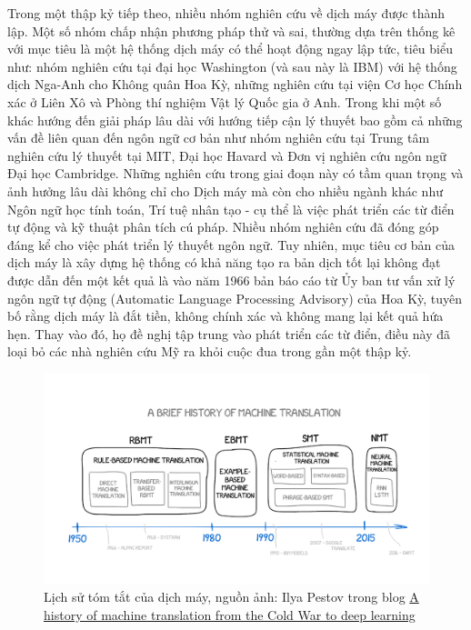 Trong một thập kỷ tiếp theo, nhiều nhóm nghiên cứu về dịch máy được thành lập. Một số nhóm chấp nhận phương pháp thử và sai, thường dựa trên thống kê với mục tiêu là một hệ thống dịch máy có thể hoạt động ngay lập tức, tiêu biểu như: nhóm nghiên cứu tại đại học Washington (và sau này là IBM) với hệ thống dịch Nga-Anh cho Không quân Hoa Kỳ, những nghiên cứu tại viện Cơ học Chính xác ở Liên Xô và Phòng thí nghiệm Vật lý Quốc gia ở Anh. Trong khi một số khác hướng đến giải pháp lâu dài với hướng tiếp cận lý thuyết bao gồm cả những vấn đề liên quan đến ngôn ngữ cơ bản như nhóm nghiên cứu tại Trung tâm nghiên cứu lý thuyết tại MIT, Đại học Havard và Đơn vị nghiên cứu ngôn ngữ Đại học Cambridge. Những nghiên cứu trong giai đoạn này có tầm quan trọng và ảnh hưởng lâu dài không chỉ cho Dịch máy mà còn cho nhiều ngành khác như Ngôn ngữ học tính toán, Trí tuệ nhân tạo - cụ thể là việc phát triển các từ điển tự động và kỹ thuật phân tích cú pháp. Nhiều nhóm nghiên cứu đã đóng góp đáng kể cho việc phát triển lý thuyết ngôn ngữ. Tuy nhiên, mục tiêu cơ bản của dịch máy là xây dựng hệ thống có khả năng tạo ra bản dịch tốt lại không đạt được dẫn đến một kết quả là vào năm 1966 bản báo cáo từ Ủy ban tư vấn xử lý ngôn ngữ tự động (Automatic Language Processing Advisory) của Hoa Kỳ, tuyên bố rằng dịch máy là đắt tiền, không chính xác và không mang lại kết quả hứa hẹn. Thay vào đó, họ đề nghị tập trung vào phát triển các từ điển, điều này đã loại bỏ các nhà nghiên cứu Mỹ ra khỏi cuộc đua trong gần một thập kỷ. 


\begin{figure}
	\centering
	\includegraphics[width=\textwidth]{mthistory}
	\caption[Lịch sử tóm tắt của dịch máy]{Lịch sử tóm tắt của dịch máy, nguồn ảnh: Ilya Pestov trong blog \href{https://medium.freecodecamp.org/a-history-of-machine-translation-from-the-cold-war-to-deep-learning-f1d335ce8b5}{A history of machine translation from the Cold War to deep learning}}
	\label{fig_mthistory}
\end{figure}

